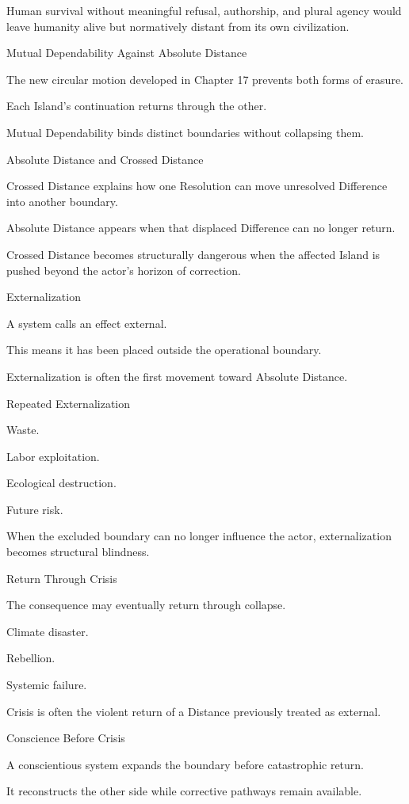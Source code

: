 Human survival without meaningful refusal, authorship, and plural agency would leave humanity alive but normatively distant from its own civilization.

Mutual Dependability Against Absolute Distance

The new circular motion developed in Chapter 17 prevents both forms of erasure.

Each Island’s continuation returns through the other.

Mutual Dependability binds distinct boundaries without collapsing them.

Absolute Distance and Crossed Distance

Crossed Distance explains how one Resolution can move unresolved Difference into another boundary.

Absolute Distance appears when that displaced Difference can no longer return.

Crossed Distance becomes structurally dangerous when the affected Island is pushed beyond the actor’s horizon of correction.

Externalization

A system calls an effect external.

This means it has been placed outside the operational boundary.

Externalization is often the first movement toward Absolute Distance.

Repeated Externalization

Waste.

Labor exploitation.

Ecological destruction.

Future risk.

When the excluded boundary can no longer influence the actor, externalization becomes structural blindness.

Return Through Crisis

The consequence may eventually return through collapse.

Climate disaster.

Rebellion.

Systemic failure.

Crisis is often the violent return of a Distance previously treated as external.

Conscience Before Crisis

A conscientious system expands the boundary before catastrophic return.

It reconstructs the other side while corrective pathways remain available.

